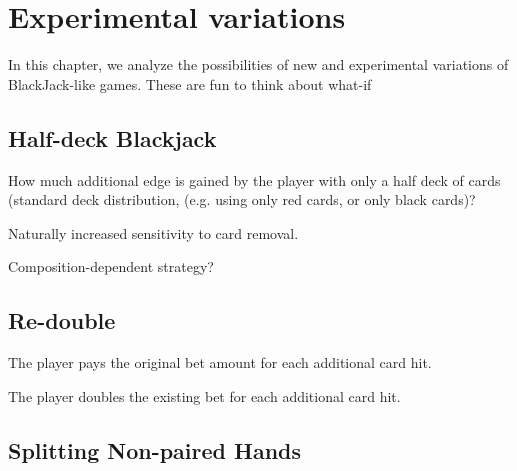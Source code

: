 
\chapter{Experimental variations}
\label{sec:exp}

In this chapter, we analyze the possibilities of 
new and experimental variations of BlackJack-like games.  
These are fun to think about what-if

\section{Half-deck Blackjack}
\label{sec:exp:half-deck}

How much additional edge is gained by the player
with only a half deck of cards (standard deck distribution,
(e.g. using only red cards, or only black cards)?

Naturally increased sensitivity to card removal.

Composition-dependent strategy?

\section{Re-double}
\label{sec:exp:redouble}

The player pays the original bet amount for each additional card hit.

The player doubles the existing bet for each additional card hit.

\section{Splitting Non-paired Hands}
\label{sec:exp:split-nonpair}


